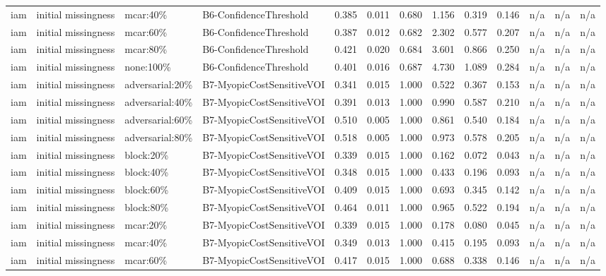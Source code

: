\begin{table}[!ht]
{\begin{tabular}{lllllllllllll}
iam & initial missingness & mcar:40\% & B6-ConfidenceThreshold & 0.385 & 0.011 & 0.680 & 1.156 & 0.319 & 0.146 & n/a & n/a & n/a \\
iam & initial missingness & mcar:60\% & B6-ConfidenceThreshold & 0.387 & 0.012 & 0.682 & 2.302 & 0.577 & 0.207 & n/a & n/a & n/a \\
iam & initial missingness & mcar:80\% & B6-ConfidenceThreshold & 0.421 & 0.020 & 0.684 & 3.601 & 0.866 & 0.250 & n/a & n/a & n/a \\
iam & initial missingness & none:100\% & B6-ConfidenceThreshold & 0.401 & 0.016 & 0.687 & 4.730 & 1.089 & 0.284 & n/a & n/a & n/a \\
iam & initial missingness & adversarial:20\% & B7-MyopicCostSensitiveVOI & 0.341 & 0.015 & 1.000 & 0.522 & 0.367 & 0.153 & n/a & n/a & n/a \\
iam & initial missingness & adversarial:40\% & B7-MyopicCostSensitiveVOI & 0.391 & 0.013 & 1.000 & 0.990 & 0.587 & 0.210 & n/a & n/a & n/a \\
iam & initial missingness & adversarial:60\% & B7-MyopicCostSensitiveVOI & 0.510 & 0.005 & 1.000 & 0.861 & 0.540 & 0.184 & n/a & n/a & n/a \\
iam & initial missingness & adversarial:80\% & B7-MyopicCostSensitiveVOI & 0.518 & 0.005 & 1.000 & 0.973 & 0.578 & 0.205 & n/a & n/a & n/a \\
iam & initial missingness & block:20\% & B7-MyopicCostSensitiveVOI & 0.339 & 0.015 & 1.000 & 0.162 & 0.072 & 0.043 & n/a & n/a & n/a \\
iam & initial missingness & block:40\% & B7-MyopicCostSensitiveVOI & 0.348 & 0.015 & 1.000 & 0.433 & 0.196 & 0.093 & n/a & n/a & n/a \\
iam & initial missingness & block:60\% & B7-MyopicCostSensitiveVOI & 0.409 & 0.015 & 1.000 & 0.693 & 0.345 & 0.142 & n/a & n/a & n/a \\
iam & initial missingness & block:80\% & B7-MyopicCostSensitiveVOI & 0.464 & 0.011 & 1.000 & 0.965 & 0.522 & 0.194 & n/a & n/a & n/a \\
iam & initial missingness & mcar:20\% & B7-MyopicCostSensitiveVOI & 0.339 & 0.015 & 1.000 & 0.178 & 0.080 & 0.045 & n/a & n/a & n/a \\
iam & initial missingness & mcar:40\% & B7-MyopicCostSensitiveVOI & 0.349 & 0.013 & 1.000 & 0.415 & 0.195 & 0.093 & n/a & n/a & n/a \\
iam & initial missingness & mcar:60\% & B7-MyopicCostSensitiveVOI & 0.417 & 0.015 & 1.000 & 0.688 & 0.338 & 0.146 & n/a & n/a & n/a \\

\end{tabular}}
\end{table}

